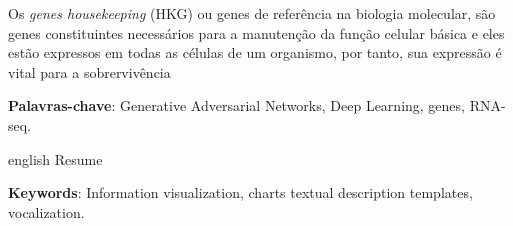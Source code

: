 \documentclass[
	12pt,				%
	openright,			%
	oneside,			%
	a4paper,			%
	english,			%
	brazil				%
	]{abntex2}
\newcommand{\listofquadrosname}{Lista de quadros}
\begin{document}





\setlength{\absparsep}{18pt} %
\begin{resumo}
Os \textit{genes housekeeping} (HKG) ou genes de referência na biologia molecular, são genes constituintes necessários para a manutenção da função celular básica e eles estão expressos em todas as células de um organismo, por tanto, sua expressão é vital para a sobrervivência

 \textbf{Palavras-chave}: Generative Adversarial Networks, Deep Learning, genes, RNA-seq.
\end{resumo}

\begin{resumo}[Abstract]
 \begin{otherlanguage*}{english}
   Resume

   \vspace{\onelineskip}
 
   \noindent 
   \textbf{Keywords}: Information visualization, charts textual description templates, vocalization.
 \end{otherlanguage*}
\end{resumo}


\listoffigures*
\cleardoublepage


\listoftables*
\cleardoublepage
\end{document}
